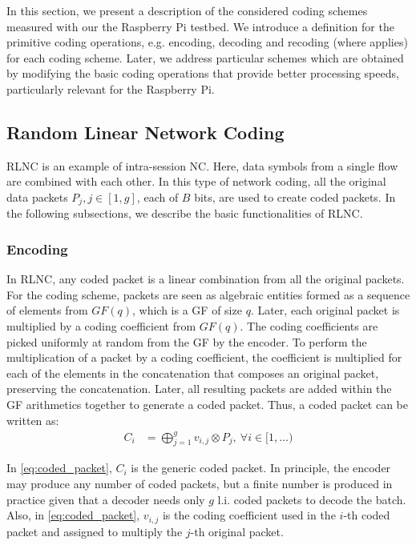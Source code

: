 \label{sec:schemes}

In this section, we present a description of the considered coding schemes
measured with our the Raspberry Pi testbed. We introduce a definition
for the primitive coding operations, e.g. encoding, decoding and recoding
(where applies) for each coding scheme. Later, we address particular schemes
which are obtained by modifying the basic coding operations that provide
better processing speeds, particularly relevant for the Raspberry Pi.

\subsection{Random Linear Network Coding}

\ac{RLNC} is an example of intra-session \ac{NC}. Here, data symbols from a
single flow are combined with each other. In this type of network coding,
all the original data packets $P_j, j \in [1,g]$, each of $B$ bits, are used
to create coded packets. In the following subsections, we describe the
basic functionalities of \ac{RLNC}.

\subsubsection{Encoding}
In \ac{RLNC}, any coded packet is a linear combination from all
the original packets. For the coding scheme, packets are seen as
algebraic entities formed as a sequence of elements from $GF(q)$,
which is a \ac{GF} of size $q$. Later, each original packet is
multiplied by a coding coefficient from $GF(q)$. The coding coefficients
are picked uniformly at random from the \ac{GF} by the encoder. To
perform the multiplication of a packet by a coding coefficient, the
coefficient is multiplied for each of the elements in the
concatenation that composes an original packet, preserving the
concatenation. Later, all resulting packets are added within the
\ac{GF} arithmetics together to generate a coded packet. Thus, a
coded packet can be written as:
%
\begin{align} \label{eq:coded_packet}
C_i  &= \bigoplus_{j=1}^{g} v_{i,j} \otimes P_j ,\ \forall i \in [1,\ldots)
\end{align}

In \eqref{eq:coded_packet}, $C_i$ is the generic coded packet. In principle,
the encoder may produce any number of coded packets, but a finite
number is produced in practice given that a decoder needs only
$g$ \ac{l.i.} coded packets to decode the batch. Also, in
\eqref{eq:coded_packet}, $v_{i,j}$ is the coding coefficient used in the
$i$-th coded packet and assigned to multiply the $j$-th original packet.

